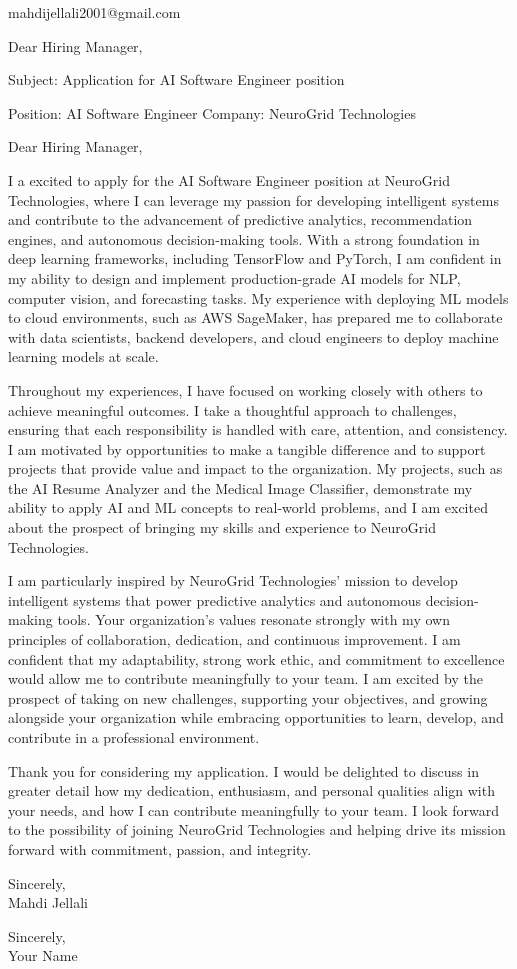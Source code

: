 \documentclass[11pt,a4paper]{letter}
\begin{document}
\begin{letter}{mahdijellali2001@gmail.com}

\opening{Dear Hiring Manager,}

Subject: Application for AI Software Engineer position

Position: AI Software Engineer
Company: NeuroGrid Technologies

Dear Hiring Manager,

I a excited to apply for the AI Software Engineer position at NeuroGrid Technologies, where I can leverage my passion for developing intelligent systems and contribute to the advancement of predictive analytics, recommendation engines, and autonomous decision-making tools. With a strong foundation in deep learning frameworks, including TensorFlow and PyTorch, I am confident in my ability to design and implement production-grade AI models for NLP, computer vision, and forecasting tasks. My experience with deploying ML models to cloud environments, such as AWS SageMaker, has prepared me to collaborate with data scientists, backend developers, and cloud engineers to deploy machine learning models at scale.

Throughout my experiences, I have focused on working closely with others to achieve meaningful outcomes. I take a thoughtful approach to challenges, ensuring that each responsibility is handled with care, attention, and consistency. I am motivated by opportunities to make a tangible difference and to support projects that provide value and impact to the organization. My projects, such as the AI Resume Analyzer and the Medical Image Classifier, demonstrate my ability to apply AI and ML concepts to real-world problems, and I am excited about the prospect of bringing my skills and experience to NeuroGrid Technologies.

I am particularly inspired by NeuroGrid Technologies' mission to develop intelligent systems that power predictive analytics and autonomous decision-making tools. Your organization's values resonate strongly with my own principles of collaboration, dedication, and continuous improvement. I am confident that my adaptability, strong work ethic, and commitment to excellence would allow me to contribute meaningfully to your team. I am excited by the prospect of taking on new challenges, supporting your objectives, and growing alongside your organization while embracing opportunities to learn, develop, and contribute in a professional environment.

Thank you for considering my application. I would be delighted to discuss in greater detail how my dedication, enthusiasm, and personal qualities align with your needs, and how I can contribute meaningfully to your team. I look forward to the possibility of joining NeuroGrid Technologies and helping drive its mission forward with commitment, passion, and integrity.

Sincerely,\\[12pt]

Mahdi Jellali

\closing{Sincerely,\\Your Name}

\end{letter}
\end{document}
